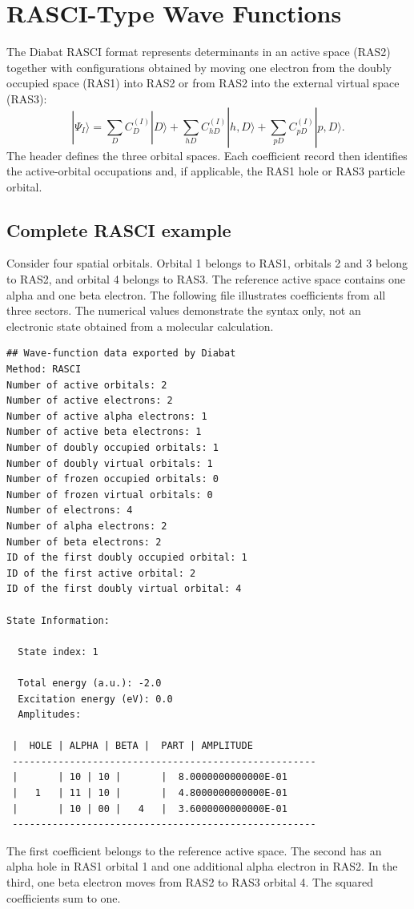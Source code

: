 \section{RASCI-Type Wave Functions}\label{sec-diabat-wfn-rasci}
The Diabat RASCI format represents determinants in an active space (RAS2) together with configurations obtained by moving one electron from the doubly occupied space (RAS1) into RAS2 or from RAS2 into the external virtual space (RAS3):
\begin{equation}
|\Psi_I\rangle=\sum_D C_D^{(I)}|D\rangle
+\sum_{hD}C_{hD}^{(I)}|h,D\rangle
+\sum_{pD}C_{pD}^{(I)}|p,D\rangle.
\end{equation}
The header defines the three orbital spaces. Each coefficient record then identifies the active-orbital occupations and, if applicable, the RAS1 hole or RAS3 particle orbital.

\subsection*{Complete RASCI example}
Consider four spatial orbitals. Orbital 1 belongs to RAS1, orbitals 2 and 3 belong to RAS2, and orbital 4 belongs to RAS3. The reference active space contains one alpha and one beta electron. The following file illustrates coefficients from all three sectors. The numerical values demonstrate the syntax only, not an electronic state obtained from a molecular calculation.
\begin{lstlisting}[style=technicalfile]
## Wave-function data exported by Diabat
Method: RASCI
Number of active orbitals: 2
Number of active electrons: 2
Number of active alpha electrons: 1
Number of active beta electrons: 1
Number of doubly occupied orbitals: 1
Number of doubly virtual orbitals: 1
Number of frozen occupied orbitals: 0
Number of frozen virtual orbitals: 0
Number of electrons: 4
Number of alpha electrons: 2
Number of beta electrons: 2
ID of the first doubly occupied orbital: 1
ID of the first active orbital: 2
ID of the first doubly virtual orbital: 4

State Information:

  State index: 1

  Total energy (a.u.): -2.0
  Excitation energy (eV): 0.0
  Amplitudes:

 |  HOLE | ALPHA | BETA |  PART | AMPLITUDE
 -----------------------------------------------------
 |       | 10 | 10 |       |  8.0000000000000E-01
 |   1   | 11 | 10 |       |  4.8000000000000E-01
 |       | 10 | 00 |   4   |  3.6000000000000E-01
 -----------------------------------------------------
\end{lstlisting}
The first coefficient belongs to the reference active space. The second has an alpha hole in RAS1 orbital 1 and one additional alpha electron in RAS2. In the third, one beta electron moves from RAS2 to RAS3 orbital 4. The squared coefficients sum to one.

